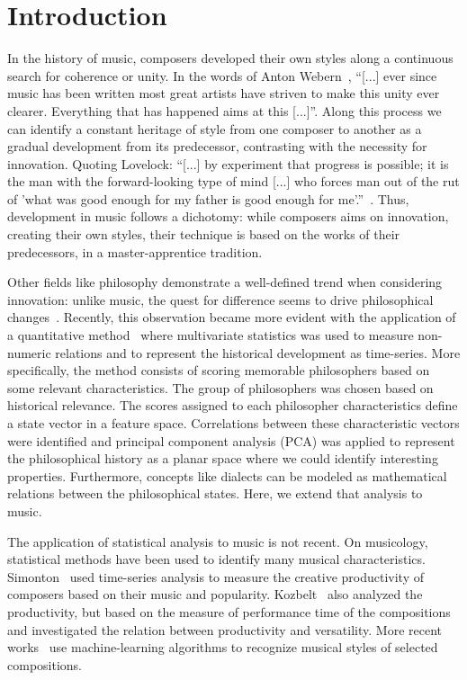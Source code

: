 \documentclass[
 aip,
 jmp,
 amsmath,amssymb,
 reprint,
]{revtex4-1}
\begin{document}
\section{\label{sec:level1}Introduction}

In the history of music, composers developed their own styles along a
continuous search for coherence or unity. In the words of Anton
Webern~\cite{Webern}, ``[...] ever since music has been written most great artists
have striven to make this unity ever clearer. Everything that has
happened aims at this [...]''. Along this process we can identify
a constant heritage of style from one composer to another as
a gradual development from its
predecessor, contrasting with the necessity for innovation. Quoting
Lovelock: 
``[...] by experiment that progress is possible; it is the man
with the forward-looking type of mind [...] who forces man out of the
rut of 'what was good enough for my father is good enough for me'.''~\cite{Lovelock}.
Thus, development in music follows a dichotomy: while composers aims on
innovation, creating their own styles, their technique is based on the
works of their predecessors, in a master-apprentice tradition.

Other fields like philosophy demonstrate
a well-defined trend when considering innovation: unlike music, the
quest for difference seems to drive philosophical
changes~\cite{Deleuze}. Recently, this observation became more evident with
the application of a quantitative method~\cite{Fabbri} where
multivariate statistics was used to measure non-numeric relations and
to represent the historical development as time-series. More specifically, the method consists of
scoring memorable philosophers based on some relevant
characteristics. The group of philosophers was chosen
based on historical relevance. The
scores assigned to each philosopher characteristics define a state
vector in a feature space. Correlations between these
characteristic vectors were identified and principal component
analysis (PCA) was applied to
represent the philosophical history as a planar space where we could
identify interesting properties. Furthermore, concepts
like dialects can be modeled as mathematical relations between the
philosophical states. Here, we extend that analysis to music.

The application of statistical analysis to
music is not recent. On musicology, statistical methods have been used
to identify many musical characteristics.
Simonton~\cite{Simonton1991829, Simonton1977791} used time-series analysis to measure the creative productivity
of composers based on their music and popularity. Kozbelt~\cite{Kozbelt01012009, Kozbelt01012007} also
analyzed the productivity, but based on the measure of performance
time of the compositions and investigated the relation between
productivity and versatility. More recent works~\cite{Kranenburg2004, Kranenburg2007} use machine-learning
algorithms to recognize musical styles of selected compositions.
\end{document}

